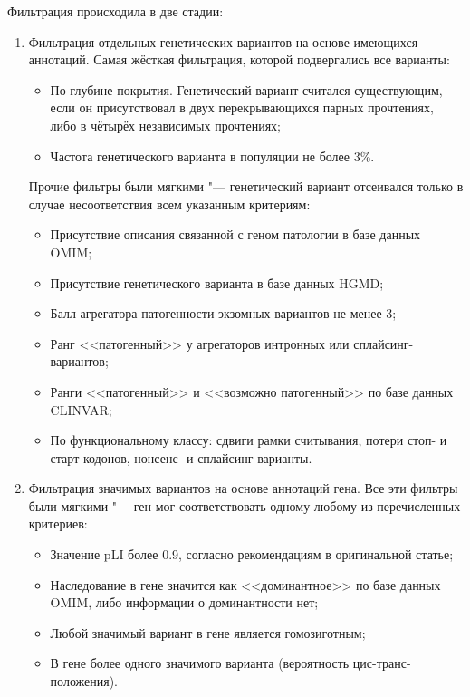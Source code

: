 \documentclass[a4paper,12pt]{article}
\begin{document}
Фильтрация происходила в две стадии:
\begin{enumerate}
\item Фильтрация отдельных генетических вариантов на основе имеющихся аннотаций.
Самая жёсткая фильтрация, которой подвергались все варианты:
\begin{itemize}
\item По глубине покрытия.
Генетический вариант считался существующим, если он присутствовал в двух перекрывающихся парных прочтениях, либо в чётырёх независимых прочтениях;
\item Частота генетического варианта в популяции не более 3\%\cite{ryzhkova}.
\end{itemize}

Прочие фильтры были мягкими "--- генетический вариант отсеивался только в случае несоответствия всем указанным критериям:

\begin{itemize}
\item Присутствие описания связанной с геном патологии в базе данных OMIM;
\item Присутствие генетического варианта в базе данных HGMD;
\item Балл агрегатора патогенности экзомных вариантов не менее 3\cite{ryzhkova};
\item Ранг <<патогенный>> у агрегаторов интронных или сплайсинг-вариантов;
\item Ранги <<патогенный>> и <<возможно патогенный>> по базе данных CLINVAR;
\item По функциональному классу: сдвиги рамки считывания, потери стоп- и старт-кодонов, нонсенс- и сплайсинг-варианты.
\end{itemize}

\item Фильтрация значимых вариантов на основе аннотаций гена.
Все эти фильтры были мягкими "--- ген мог соответствовать одному любому из перечисленных критериев:

\begin{itemize}
\item Значение pLI более 0.9, согласно рекомендациям в оригинальной статье\cite{lek};
\item Наследование в гене значится как <<доминантное>> по базе данных OMIM, либо информации о доминантности нет;
\item Любой значимый вариант в гене является гомозиготным;
\item В гене более одного значимого варианта (вероятность цис-транс-положения).
\end{itemize}
\end{enumerate}
\end{document}
